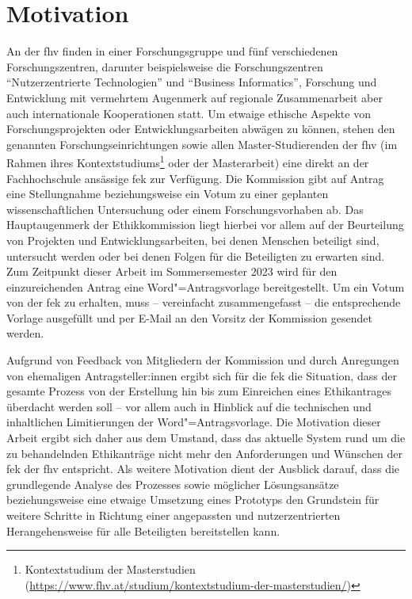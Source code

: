 \documentclass[a4paper,12pt,twoside]{scrreprt}
\begin{document}
\section{Motivation}
\label{sec:motivation}

An der \acl{fhv} finden in einer Forschungsgruppe und fünf verschiedenen Forschungszentren, darunter beispielsweise die Forschungszentren \enquote{Nutzerzentrierte Technologien} und \enquote{Business Informatics}, Forschung und Entwicklung mit vermehrtem Augenmerk auf regionale Zusammenarbeit aber auch internationale Kooperationen statt. \cite{fachhochschule_vorarlberg_gmbh_forschung_2021} Um etwaige ethische Aspekte von Forschungsprojekten oder Entwicklungsarbeiten abwägen zu können, stehen den genannten Forschungseinrichtungen sowie allen Master-Studierenden der \acl{fhv} (im Rahmen ihres Kontextstudiums\footnote{Kontextstudium der Masterstudien (\url{https://www.fhv.at/studium/kontextstudium-der-masterstudien/})} oder der Masterarbeit) eine direkt an der Fachhochschule ansässige \acl{fek} zur Verfügung. Die Kommission gibt auf Antrag eine Stellungnahme beziehungsweise ein Votum zu einer geplanten wissenschaftlichen Untersuchung oder einem Forschungsvorhaben ab. Das Hauptaugenmerk der Ethikkommission liegt hierbei vor allem auf der Beurteilung von Projekten und Entwicklungsarbeiten, bei denen Menschen beteiligt sind, untersucht werden oder bei denen Folgen für die Beteiligten zu erwarten sind. Zum Zeitpunkt dieser Arbeit im Sommersemester 2023 wird für den einzureichenden Antrag eine Word"=Antragsvorlage bereitgestellt. Um ein Votum von der \acl{fek} zu erhalten, muss -- vereinfacht zusammengefasst -- die entsprechende Vorlage ausgefüllt und per E-Mail an den Vorsitz der Kommission gesendet werden. \cite{fachhochschule_vorarlberg_gmbh_forschungsethik-kommission_2021}

\medskip

Aufgrund von Feedback von Mitgliedern der Kommission und durch Anregungen von ehemaligen Antragsteller:innen ergibt sich für die \acl{fek} die Situation, dass der gesamte Prozess von der Erstellung hin bis zum Einreichen eines Ethikantrages überdacht werden soll -- vor allem auch in Hinblick auf die technischen und inhaltlichen Limitierungen der Word"=Antragsvorlage. Die Motivation dieser Arbeit ergibt sich daher aus dem Umstand, dass das aktuelle System rund um die zu behandelnden Ethikanträge nicht mehr den Anforderungen und Wünschen der \acl{fek} der \acl{fhv} entspricht. Als weitere Motivation dient der Ausblick darauf, dass die grundlegende Analyse des Prozesses sowie möglicher Lösungsansätze beziehungsweise eine etwaige Umsetzung eines Prototyps den Grundstein für weitere Schritte in Richtung einer angepassten und nutzerzentrierten Herangehensweise für alle Beteiligten bereitstellen kann. 
\end{document}
